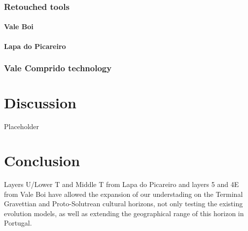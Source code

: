 \documentclass[12pt,twoside]{reedthesis}
\begin{document}
\hypertarget{retouched-tools}{%
\subsection{Retouched tools}\label{retouched-tools}}

\hypertarget{vale-boi-7}{%
\subsubsection{Vale Boi}\label{vale-boi-7}}

\hypertarget{lapa-do-picareiro-7}{%
\subsubsection{Lapa do Picareiro}\label{lapa-do-picareiro-7}}

\hypertarget{vale-comprido-technology}{%
\subsection{Vale Comprido technology}\label{vale-comprido-technology}}

\hypertarget{discussion}{%
\chapter{Discussion}\label{discussion}}

Placeholder

\hypertarget{conclusion}{%
\chapter*{Conclusion}\label{conclusion}}

Layers U/Lower T and Middle T from Lapa do Picareiro and layers 5 and 4E from Vale Boi have allowed the expansion of our understading on the Terminal Gravettian and Proto-Solutrean cultural horizons, not only testing the existing evolution models, as well as extending the geographical range of this horizon in Portugal.
\end{document}
